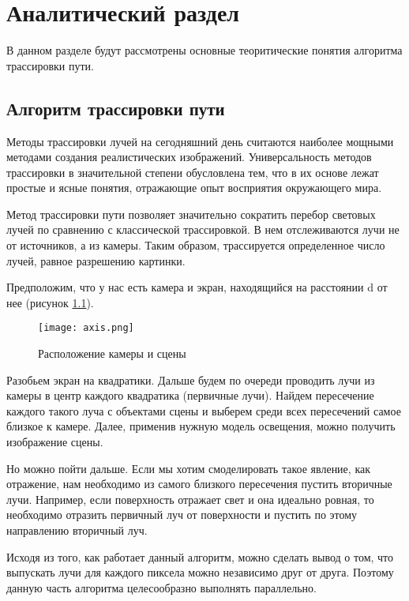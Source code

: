 \documentclass[utf8x, 12pt]{G7-32}
\begin{document}
\newpage

\mainmatter %
\chapter{ Аналитический раздел}
\label{cha:analytical}
    В данном разделе будут рассмотрены основные теоритические понятия алгоритма трассировки пути.

    \section{Алгоритм трассировки пути}
	Методы трассировки лучей на сегодняшний день считаются наиболее мощными методами создания реалистических изображений. Универсальность методов трассировки в значительной степени обусловлена тем, что в их основе лежат простые и ясные понятия, отражающие опыт восприятия окружающего мира.

	Метод трассировки пути позволяет значительно сократить перебор световых лучей по сравнению с классической трассировкой. В нем отслеживаются лучи не от источников, а из камеры. Таким образом, трассируется определенное число лучей, равное разрешению картинки.

	Предположим, что у нас есть камера и экран, находящийся на расстоянии d от нее (рисунок \ref{png:axis}).

        \begin{figure}[h!]
            \centering
            \texttt{[image: axis.png]}
	 \caption{Расположение камеры и сцены}
            \label{png:axis}
        \end{figure} 

 Разобьем экран на квадратики. Дальше будем по очереди проводить лучи из камеры в центр каждого квадратика (первичные лучи). Найдем пересечение каждого такого луча с объектами сцены и выберем среди всех пересечений самое близкое к камере. Далее, применив нужную модель освещения, можно получить изображение сцены.

	Но можно пойти дальше. Если мы хотим смоделировать такое явление, как отражение, нам необходимо из самого близкого пересечения пустить вторичные лучи. Например, если поверхность отражает свет и она идеально ровная, то необходимо отразить первичный луч от поверхности и пустить по этому направлению вторичный луч.

	Исходя из того, как работает данный алгоритм, можно сделать вывод о том, что выпускать лучи для каждого пиксела можно независимо друг от друга. Поэтому данную часть алгоритма целесообразно выполнять параллельно.
\end{document}
